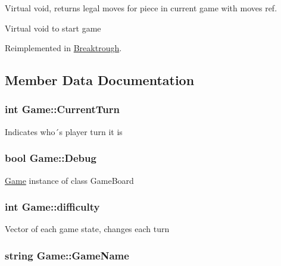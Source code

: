 Virtual void, returns legal moves for piece in current game with moves ref. 

Virtual void to start game 

Reimplemented in \hyperlink{class_breaktrough_a1e4b2c80e074f7052c4c491abe95c9f6}{Breaktrough}.



\subsection{Member Data Documentation}
\hypertarget{class_game_a88700a4643e08b12130ba2950c54ed8b}{
\subsubsection[{Current\-Turn}]{\setlength{\rightskip}{0pt plus 5cm}int Game\-::\-Current\-Turn\hspace{0.3cm}{\ttfamily [protected]}}}\label{class_game_a88700a4643e08b12130ba2950c54ed8b}
Indicates who´s player turn it is \hypertarget{class_game_ad79740c2d2fa299cf322bf6ea322d9aa}{
\subsubsection[{Debug}]{\setlength{\rightskip}{0pt plus 5cm}bool Game\-::\-Debug}}\label{class_game_ad79740c2d2fa299cf322bf6ea322d9aa}
\hyperlink{class_game}{Game} instance of class Game\-Board \hypertarget{class_game_a536a6390d16f05d402928bd731e06ef3}{
\subsubsection[{difficulty}]{\setlength{\rightskip}{0pt plus 5cm}int Game\-::difficulty\hspace{0.3cm}{\ttfamily [protected]}}}\label{class_game_a536a6390d16f05d402928bd731e06ef3}
Vector of each game state, changes each turn \hypertarget{class_game_a1b56d5db37d900da0911378cc01f4cad}{
\subsubsection[{Game\-Name}]{\setlength{\rightskip}{0pt plus 5cm}string Game\-::\-Game\-Name\hspace{0.3cm}{\ttfamily [protected]}}}\label{class_game_a1b56d5db37d900da0911378cc01f4cad}
